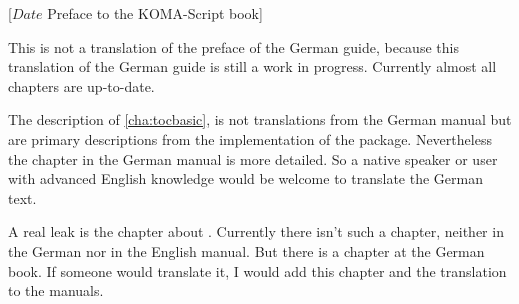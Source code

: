 %
%
%
%
%
%
%
%
%

                 [$Date$
                  Preface to the KOMA-Script book]



This is not a translation of the preface of the German \KOMAScript{} guide,
because this translation of the German \KOMAScript{} guide is still a work in
progress. Currently almost all chapters are up-to-date.

The description of \autoref{cha:tocbasic}, is not
translations from the German manual but are primary descriptions from the
implementation of the package. Nevertheless the chapter in the German manual
is more detailed. So a native speaker or user with advanced English knowledge
would be welcome to translate the German text.

A real leak is the chapter about . Currently there isn't such
a chapter, neither in the German nor in the English manual. But there is a
chapter at the German \KOMAScript{} book. If someone would translate it, I
would add this chapter and the translation to the manuals.

